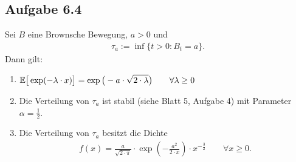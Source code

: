 \subsection{Aufgabe 6.4}
Sei $B$ eine Brownsche Bewegung, $a>0$ und
\begin{align*}
	\tau_a:=\inf\big\lbrace t>0:B_t=a\big\rbrace.
\end{align*}
Dann gilt:
\begin{enumerate}[label=\alph*)]
	\item $\begin{aligned}
		\mathbb{E}\big[\exp(-\lambda\cdot x)\big]=\exp\big(-a\cdot\sqrt{2\cdot\lambda}\big)\qquad\forall \lambda\geq0
	\end{aligned}$
	\item Die Verteilung von $\tau_a$ ist stabil (siehe Blatt 5, Aufgabe 4) mit Parameter $\alpha=\frac{1}{2}$.
	\item Die Verteilung von $\tau_a$ besitzt die Dichte
	\begin{align*}
		f(x)=\frac{a}{\sqrt{2\cdot\pi}}\cdot\exp\left(-\frac{a^2}{2\cdot x}\right)\cdot x^{-\frac{3}{2}}\qquad\forall x\geq0.
	\end{align*}
\end{enumerate}

